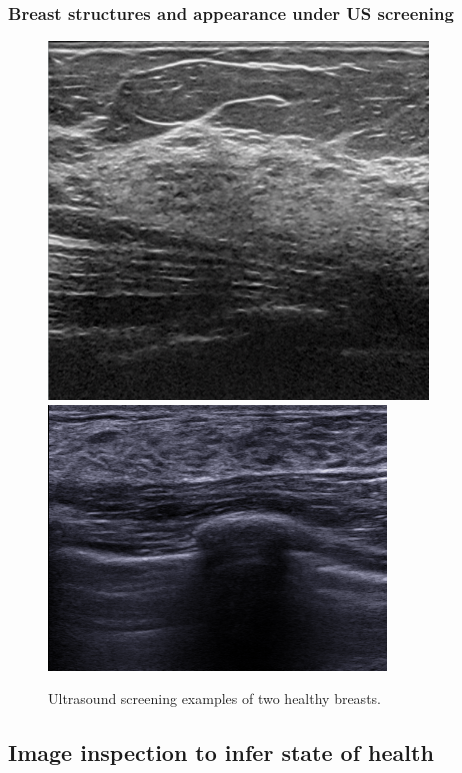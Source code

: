 \begin{frame}\frametitle{Breast structures and appearance under US screening}
		\begin{figure}
		\includegraphics[height=.55\textheight]{sa1.png}~
		\includegraphics[height=.55\textheight]{sa2.png}
		\caption{ Ultrasound screening examples of two healthy breasts.}
		\end{figure}	
\end{frame}

\subsection{Image inspection to infer state of health}

